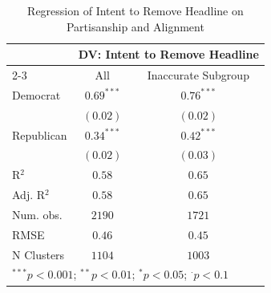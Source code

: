 
\begin{table}[!htpb]
\caption{Regression of Intent to Remove Headline on Partisanship and Alignment}
\begin{center}
\begin{tabular}{l c c}
\hline
 & \multicolumn{2}{c}{DV: Intent to Remove Headline} \\
\cline{2-3}
 & All & Inaccurate Subgroup \\
\hline
Democrat   & $0.69^{***}$ & $0.76^{***}$ \\
           & $(0.02)$     & $(0.02)$     \\
Republican & $0.34^{***}$ & $0.42^{***}$ \\
           & $(0.02)$     & $(0.03)$     \\
\hline
R$^2$      & $0.58$       & $0.65$       \\
Adj. R$^2$ & $0.58$       & $0.65$       \\
Num. obs.  & $2190$       & $1721$       \\
RMSE       & $0.46$       & $0.45$       \\
N Clusters & $1104$       & $1003$       \\
\hline
\multicolumn{3}{l}{\scriptsize{$^{***}p<0.001$; $^{**}p<0.01$; $^{*}p<0.05$; $^{\cdot}p<0.1$}}
\end{tabular}
\label{tab:withoutinteraction-mainspecification-remove-weighted-clusteredses-ld}
\end{center}
\end{table}
